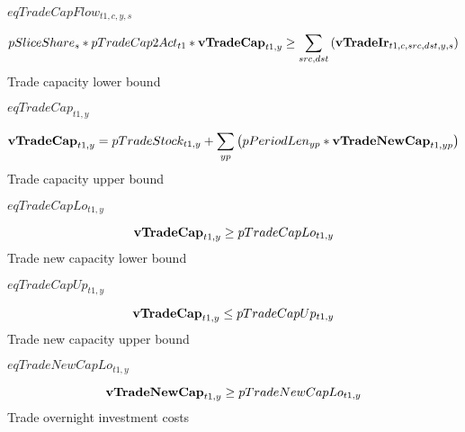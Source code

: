 \documentclass{article}
\begin{document}
$eqTradeCapFlow_{t1,c,y,s}$





\begin{dmath}
pSliceShare_{s}*pTradeCap2Act_{t1}*{\bf vTradeCap}_{t1,y}  \ge  \sum_{src,dst}{\left({\bf vTradeIr}_{t1,c,src,dst,y,s}\right)}
\end{dmath}
Trade capacity lower bound







$eqTradeCap_{t1,y}$





\begin{dmath}
{\bf vTradeCap}_{t1,y}  =  pTradeStock_{t1,y}+\sum_{yp}{\left(pPeriodLen_{yp}*{\bf vTradeNewCap}_{t1,yp}\right)}
\end{dmath}
Trade capacity upper bound







$eqTradeCapLo_{t1,y}$





\begin{dmath}
{\bf vTradeCap}_{t1,y}  \ge  pTradeCapLo_{t1,y}
\end{dmath}
Trade new capacity lower bound







$eqTradeCapUp_{t1,y}$





\begin{dmath}
{\bf vTradeCap}_{t1,y}  \le  pTradeCapUp_{t1,y}
\end{dmath}
Trade new capacity upper bound







$eqTradeNewCapLo_{t1,y}$





\begin{dmath}
{\bf vTradeNewCap}_{t1,y}  \ge  pTradeNewCapLo_{t1,y}
\end{dmath}
Trade overnight investment costs
\end{document}
